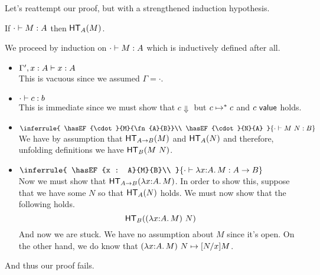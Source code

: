 \documentclass{article}
\begin{document}
Let's reattempt our proof, but with a strengthened induction hypothesis.
\begin{claim}
  If $\cdot \vdash M : A$ then $\mathsf{HT}_{A}(M)$.
\end{claim}
\begin{proofattempt}
  We proceed by induction on $\cdot \vdash M : A$ which is
  inductively defined after all.
  \begin{itemize}
  \setlength\itemsep{1em}
  \item $\Gamma', x : A \vdash x : A$\\
    This is vacuous since we assumed $\Gamma = \cdot$.
  \item $\cdot \vdash c : b$\\
    This is immediate since we must show that $c \Downarrow$ but
    $c \mapsto^* c$ and $c\ \mathsf{value}$ holds.
  \item $\inferrule{
      \hasEF{\cdot}{M}{\fn{A}{B}}\\
      \hasEF{\cdot}{N}{A}
    }{\hasEF{\cdot}{\ap{M}{N}}{B}}$\\
    We have by assumption that $\mathsf{HT}_{A \to B}(M)$ and
    $\mathsf{HT}_{A}(N)$ and therefore, unfolding definitions we have
    $\mathsf{HT}_{B}(M\ N)$.
  \item
    $\inferrule{
      \hasEF{x : A}{M}{B}\\
    }{\hasEF{\cdot}{\lam{x}{A}{M}}{\fn{A}{B}}}$\\
    Now we must show that $\mathsf{HT}_{A \to B}(\lambda x {:} A.\, M)$. In order to
    show this, suppose that we have some $N$ so that $\mathsf{HT}_{A}(N)$
    holds. We must now show that the following holds.
    \[
      \mathsf{HT}_{B}((\lambda x {:} A.\, M)\ N)
    \]
    And now we are stuck. We have no assumption about $M$ since it's
    open. On the other hand, we do know that
    $(\lambda x {:} A.\, M)\ N \mapsto [N/x]M$.
  \end{itemize}
  And thus our proof fails.
\end{proofattempt}
\end{document}
